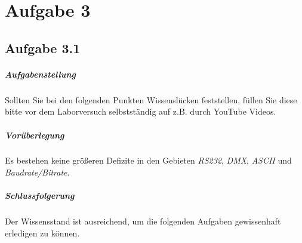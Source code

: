 \chapter{Aufgabe 3}
\section{Aufgabe 3.1}

\paragraph{Aufgabenstellung}
Sollten Sie bei den folgenden Punkten Wissenslücken feststellen, füllen Sie diese bitte vor dem Laborversuch selbstständig auf z.B. durch YouTube Videos.

\paragraph{Vorüberlegung}
Es bestehen keine größeren Defizite in den Gebieten \textit{RS232}, \textit{DMX}, \textit{ASCII} und \textit{Baudrate/Bitrate}.

\paragraph{Schlussfolgerung}
Der Wissensstand ist ausreichend, um die folgenden Aufgaben gewissenhaft erledigen zu können.